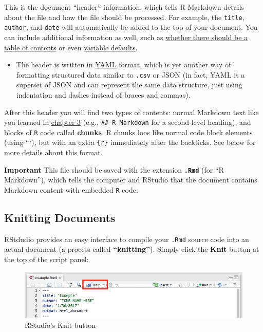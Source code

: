 \documentclass[]{book}
\providecommand{\tightlist}{%
  \setlength{\itemsep}{0pt}\setlength{\parskip}{0pt}}
\theoremstyle{definition}
\theoremstyle{definition}
\theoremstyle{remark}
\begin{document}
This is the document ``header'' information, which tells R Markdown
details about the file and how the file should be processed. For
example, the \texttt{title}, \texttt{author}, and \texttt{date} will
automatically be added to the top of your document. You can include
additional information as well, such as
\href{http://rmarkdown.rstudio.com/html_document_format.html}{whether
there should be a table of contents} or even
\href{http://rmarkdown.rstudio.com/developer_parameterized_reports.html}{variable
defaults}.

\begin{itemize}
\tightlist
\item
  The header is written in
  \href{https://en.wikipedia.org/wiki/YAML}{YAML} format, which is yet
  another way of formatting structured data similar to \texttt{.csv} or
  JSON (in fact, YAML is a superset of JSON and can represent the same
  data structure, just using indentation and dashes instead of braces
  and commas).
\end{itemize}

After this header you will find two types of contents: normal Markdown
text like you learned in \protect\hyperlink{markdown}{chapter 3} (e.g.,
\texttt{\#\#\ R\ Markdown} for a second-level heading), and blocks of
\texttt{R} code called \textbf{chunks}. R chunks loos like normal code
block elements (using ```), but with an extra \texttt{\{r\}} immediately
after the backticks. See below for more details about this format.

\textbf{Important} This file should be saved with the extension
\textbf{\texttt{.Rmd}} (for ``R Markdown''), which tells the computer
and RStudio that the document contains Markdown content with embedded
\texttt{R} code.

\subsection{Knitting Documents}\label{knitting-documents}

RStdudio provides an easy interface to compile your \texttt{.Rmd} source
code into an actual document (a process called \textbf{``knitting''}).
Simply click the \textbf{Knit} button at the top of the script panel:

\begin{figure}
\centering
\includegraphics{img/r-markdown/knit-button.png}
\caption{RStudio's Knit button}
\end{figure}
\end{document}
